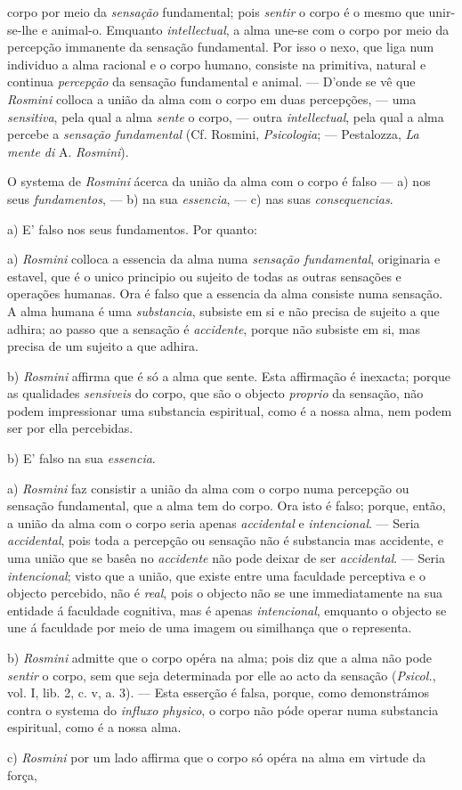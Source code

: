corpo por meio da \emph{sensação} fundamental; pois \emph{sentir} o corpo é o mesmo que unir-se-lhe e animal-o. Emquanto \emph{intellectual}, a alma une-se com o corpo por meio da percepção immanente da sensação fundamental. Por isso o nexo, que liga num individuo a alma racional e o corpo humano, consiste na primitiva, natural e continua \emph{percepção} da sensação fundamental e animal. --- D'onde se vê que \emph{Rosmini} colloca a união da alma com o corpo em duas percepções, --- uma \emph{sensitiva}, pela qual a alma \emph{sente} o corpo, --- outra \emph{intellectual}, pela qual a alma percebe a \emph{sensação fundamental} (Cf. Rosmini, \emph{Psicologia}; --- Pestalozza, \emph{La mente di} A. \emph{Rosmini}).\par O systema de \emph{Rosmini} ácerca da união da alma com o corpo é falso --- a) nos seus \emph{fundamentos}, --- b) na sua \emph{essencia}, --- c) nas suas \emph{consequencias}.\par a) E' falso nos seus fundamentos. Por quanto:\par a) \emph{Rosmini} colloca a essencia da alma numa \emph{sensação fundamental}, originaria e estavel, que é o unico principio ou sujeito de todas as outras sensações e operações humanas. Ora é falso que a essencia da alma consiste numa sensação. A alma humana é uma \emph{substancia}, subsiste em si e não precisa de sujeito a que adhira; ao passo que a sensação é \emph{accidente}, porque não subsiste em si, mas precisa de um sujeito a que adhira.\par b) \emph{Rosmini} affirma que é só a alma que sente. Esta affirmação é inexacta; porque as qualidades \emph{sensiveis} do corpo, que são o objecto \emph{proprio} da sensação, não podem impressionar uma substancia espiritual, como é a nossa alma, nem podem ser por ella percebidas.\par b) E' falso na sua \emph{essencia}.\par a) \emph{Rosmini} faz consistir a união da alma com o corpo numa percepção ou sensação fundamental, que a alma tem do corpo. Ora isto é falso; porque, então, a união da alma com o corpo seria apenas \emph{accidental} e \emph{intencional}. --- Seria \emph{accidental}, pois toda a percepção ou sensação não é substancia mas accidente, e uma união que se basêa no \emph{accidente} não pode deixar de ser \emph{accidental}. --- Seria \emph{intencional}; visto que a união, que existe entre uma faculdade perceptiva e o objecto percebido, não é \emph{real}, pois o objecto não se une immediatamente na sua entidade á faculdade cognitiva, mas é apenas \emph{intencional}, emquanto o objecto se une á faculdade por meio de uma imagem ou similhança que o representa.\par b) \emph{Rosmini} admitte que o corpo opéra na alma; pois diz que a alma não pode \emph{sentir} o corpo, sem que seja determinada por elle ao acto da sensação (\emph{Psicol.}, vol. I, lib. 2, c. v, a. 3). --- Esta esserção é falsa, porque, como demonstrámos contra o systema do \emph{influxo physico}, o corpo não póde operar numa substancia espiritual, como é a nossa alma.\par c) \emph{Rosmini} por um lado affirma que o corpo só opéra na alma em virtude da força, 
